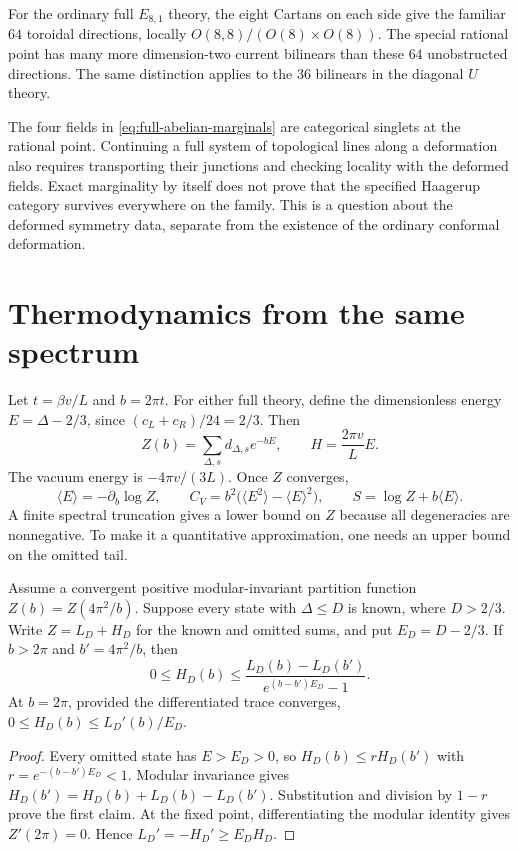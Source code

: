 For the ordinary full $E_{8,1}$ theory, the eight Cartans on each
side give the familiar $64$ toroidal directions, locally
$O(8,8)/(O(8)\times O(8))$. The special rational point has
many more dimension-two current bilinears than these $64$
unobstructed directions. The same distinction applies to the
$36$ bilinears in the diagonal $U$ theory.

The four fields in \eqref{eq:full-abelian-marginals} are
categorical singlets at the rational point. Continuing a full
system of topological lines along a deformation also requires
transporting their junctions and checking locality with the
deformed fields. Exact marginality by itself does not prove
that the specified Haagerup category survives everywhere on
the family. This is a question about the deformed symmetry
data, separate from the existence of the ordinary conformal
deformation.

\section{Thermodynamics from the same spectrum}

Let $t=\beta v/L$ and $b=2\pi t$. For either full theory,
define the dimensionless energy
$E=\Delta-2/3$, since $(c_L+c_R)/24=2/3$. Then
\begin{equation}
 Z(b)=\sum_{\Delta,s}d_{\Delta,s}e^{-bE},\qquad
 H=\frac{2\pi v}{L}E.
 \label{eq:full-thermal}
\end{equation}
The vacuum energy is $-4\pi v/(3L)$. Once $Z$ converges,
\[
 \langle E\rangle=-\partial_b\log Z,\qquad
 C_V=b^2\bigl(\langle E^2\rangle-\langle E\rangle^2\bigr),
 \qquad S=\log Z+b\langle E\rangle.
\]
A finite spectral truncation gives a lower bound on $Z$ because
all degeneracies are nonnegative. To make it a quantitative
approximation, one needs an upper bound on the omitted tail.

\begin{proposition}
\label{prop:full-thermal-tail}
Assume a convergent positive modular-invariant partition function
$Z(b)=Z(4\pi^2/b)$. Suppose every state with $\Delta\le D$
is known, where $D>2/3$. Write $Z=L_D+H_D$ for the known and
omitted sums, and put $E_D=D-2/3$. If $b>2\pi$ and
$b'=4\pi^2/b$, then
\begin{equation}
 0\le H_D(b)\le
 \frac{L_D(b)-L_D(b')}{e^{(b-b')E_D}-1}.
 \label{eq:full-tail}
\end{equation}
At $b=2\pi$, provided the differentiated trace converges,
$0\le H_D(b)\le L_D'(b)/E_D$.
\end{proposition}
\begin{proof}
Every omitted state has $E>E_D>0$, so
$H_D(b)\le rH_D(b')$ with
$r=e^{-(b-b')E_D}<1$. Modular invariance gives
$H_D(b')=H_D(b)+L_D(b)-L_D(b')$. Substitution and division by
$1-r$ prove the first claim.
At the fixed point, differentiating the modular identity gives
$Z'(2\pi)=0$. Hence
$L_D'=-H_D'\ge E_DH_D$.
\end{proof}

